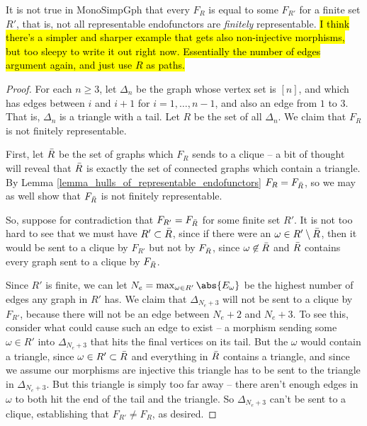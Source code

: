 \documentclass[a4paper,reqno,oneside]{article} %
\begin{document}
\begin{remark}
It is not true in $\mathrm{MonoSimpGph}$ that every $F_R$ is equal to some $F_{R'}$ for a finite set $R'$, that is, not all representable endofunctors are \emph{finitely} representable. \hl{I think there's a simpler and sharper example that gets also non-injective morphisms, but too sleepy to write it out right now. Essentially the number of edges argument again, and just use $R$ as paths.}
\begin{proof}
For each $n \geq 3$, let $\Delta_n$ be the graph whose vertex set is $[n]$, and which has edges between $i$ and $i+1$ for $i = 1,\ldots, n-1$, and also an edge from $1$ to $3$. That is, $\Delta_n$ is a triangle with a tail. Let $R$ be the set of all $\Delta_n$. We claim that $F_R$ is not finitely representable.

First, let $\Bar{R}$ be the set of graphs which $F_R$ sends to a clique -- a bit of thought will reveal that $\Bar{R}$ is exactly the set of connected graphs which contain a triangle. By Lemma \ref{lemma_hulls_of_representable_endofunctors} $F_R = F_{\Bar{R}}$, so we may as well show that $F_{\Bar{R}}$ is not finitely representable.

So, suppose for contradiction that $F_{R'} = F_{\Bar{R}}$ for some finite set $R'$. It is not too hard to see that we must have $R' \subset \Bar{R}$, since if there were an $\omega \in R' \setminus \Bar{R}$, then it would be sent to a clique by $F_{R'}$ but not by $F_{\Bar{R}}$, since $\omega \not\in \Bar{R}$ and $\Bar{R}$ contains every graph sent to a clique by $F_{\Bar{R}}$.

Since $R'$ is finite, we can let $N_e = \max_{\omega \in R'} \abs{E_\omega}$ be the highest number of edges any graph in $R'$ has. We claim that $\Delta_{N_e+3}$ will not be sent to a clique by $F_{R'}$, because there will not be an edge between $N_e+2$ and $N_e+3$. To see this, consider what could cause such an edge to exist -- a morphism sending some $\omega \in R'$ into $\Delta_{N_e+3}$ that hits the final vertices on its tail. But the $\omega$ would contain a triangle, since $\omega \in R' \subset \Bar{R}$ and everything in $\Bar{R}$ contains a triangle, and since we assume our morphisms are injective this triangle has to be sent to the triangle in $\Delta_{N_e+3}$. But this triangle is simply too far away -- there aren't enough edges in $\omega$ to both hit the end of the tail and the triangle. So $\Delta_{N_e+3}$ can't be sent to a clique, establishing that $F_{R'} \neq F_R$, as desired.
\end{proof}
\end{remark}
\end{document}
